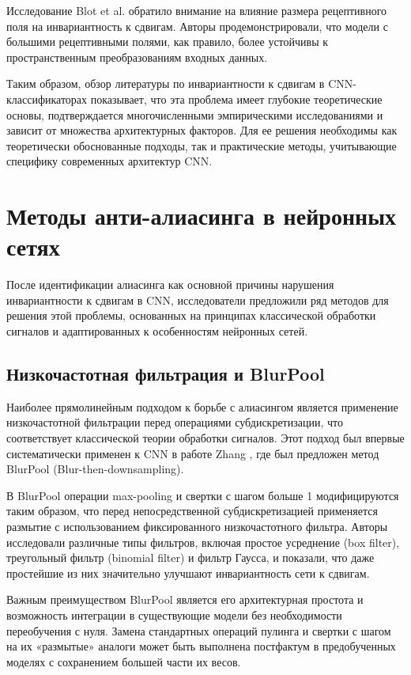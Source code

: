 Исследование Blot et al. \cite{Blot2016} обратило внимание на влияние размера рецептивного поля на инвариантность к сдвигам. Авторы продемонстрировали, что модели с большими рецептивными полями, как правило, более устойчивы к пространственным преобразованиям входных данных.

Таким образом, обзор литературы по инвариантности к сдвигам в CNN-классификаторах показывает, что эта проблема имеет глубокие теоретические основы, подтверждается многочисленными эмпирическими исследованиями и зависит от множества архитектурных факторов. Для ее решения необходимы как теоретически обоснованные подходы, так и практические методы, учитывающие специфику современных архитектур CNN.

\section{Методы анти-алиасинга в нейронных сетях}
\label{review:antialias}

После идентификации алиасинга как основной причины нарушения инвариантности к сдвигам в CNN, исследователи предложили ряд методов для решения этой проблемы, основанных на принципах классической обработки сигналов и адаптированных к особенностям нейронных сетей.

\subsection{Низкочастотная фильтрация и BlurPool}
\label{review:antialias:blurpool}

Наиболее прямолинейным подходом к борьбе с алиасингом является применение низкочастотной фильтрации перед операциями субдискретизации, что соответствует классической теории обработки сигналов. Этот подход был впервые систематически применен к CNN в работе Zhang \cite{Zhang2019}, где был предложен метод BlurPool (Blur-then-downsampling).

В BlurPool операции max-pooling и свертки с шагом больше 1 модифицируются таким образом, что перед непосредственной субдискретизацией применяется размытие с использованием фиксированного низкочастотного фильтра. Авторы исследовали различные типы фильтров, включая простое усреднение (box filter), треугольный фильтр (binomial filter) и фильтр Гаусса, и показали, что даже простейшие из них значительно улучшают инвариантность сети к сдвигам.

Важным преимуществом BlurPool является его архитектурная простота и возможность интеграции в существующие модели без необходимости переобучения с нуля. Замена стандартных операций пулинга и свертки с шагом на их «размытые» аналоги может быть выполнена постфактум в предобученных моделях с сохранением большей части их весов.

